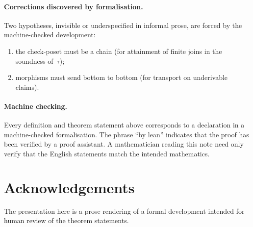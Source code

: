 \documentclass[11pt,a4paper]{article}
\theoremstyle{plain}
\theoremstyle{definition}
\begin{document}
\paragraph{Corrections discovered by formalisation.}
Two hypotheses, invisible or underspecified in informal prose, are forced
by the machine-checked development:
\begin{enumerate}
  \item the check-poset must be a chain (for attainment of finite joins
        in the soundness of~$\tau$);
  \item morphisms must send bottom to bottom (for transport on
        underivable claims).
\end{enumerate}

\paragraph{Machine checking.}
Every definition and theorem statement above corresponds to a declaration
in a machine-checked formalisation. The phrase ``by lean'' indicates that
the proof has been verified by a proof assistant. A mathematician reading
this note need only verify that the English statements match the intended
mathematics.

\section*{Acknowledgements}

The presentation here is a prose rendering of a formal development
intended for human review of the theorem statements.
\end{document}
